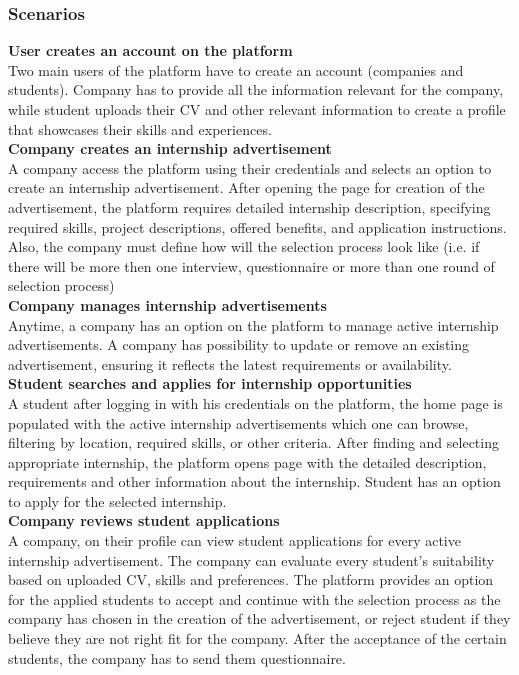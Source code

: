 \subsubsection{Scenarios}

\textbf{User creates an account on the platform}\\ 
Two main users of the platform have to create an account (companies and students). Company has to provide all the information relevant for the company, while student uploads their CV and other relevant information to create a profile that showcases their skills and experiences.\\

\textbf{Company creates an internship advertisement}\\
A company access the platform using their credentials and selects an option to create an internship advertisement. After opening the page for creation of the advertisement, the platform requires detailed internship description, specifying required skills, project descriptions, offered benefits, and application instructions. Also, the company must define how will the selection process look like (i.e. if there will be more then one interview, questionnaire or more than one round of selection process)  \\

\textbf{Company manages internship advertisements}\\
Anytime, a company has an option on the platform to manage active internship advertisements. A company has possibility to update or remove an existing advertisement, ensuring it reflects the latest requirements or availability.\\

\textbf{Student searches and applies for internship opportunities }\\
A student after logging in with his credentials on the platform, the home page is populated with the active internship advertisements which one can browse, filtering by location, required skills, or other criteria. After finding and selecting appropriate internship, the platform opens page with the detailed description, requirements and other information about the internship. Student has an option to apply for the selected internship.\\

\textbf{Company reviews student applications}\\
A company, on their profile can view student applications for every active internship advertisement. The company can evaluate every student's suitability based on uploaded CV, skills and preferences. The platform provides an option for the applied students to accept and continue with the selection process as the company has chosen in the creation of the advertisement, or reject student if they believe they are not right fit for the company. After the acceptance of the certain students, the company has to send them questionnaire. \\

